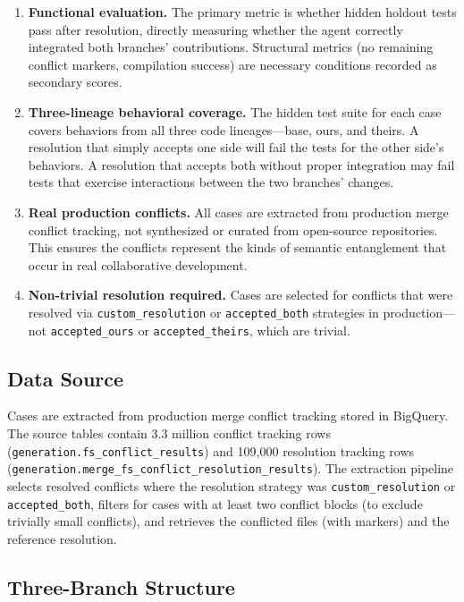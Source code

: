 \documentclass[11pt,a4paper]{article}
\begin{document}
\begin{enumerate}[leftmargin=2em]
\item \textbf{Functional evaluation.} The primary metric is whether hidden holdout tests pass after resolution, directly measuring whether the agent correctly integrated both branches' contributions. Structural metrics (no remaining conflict markers, compilation success) are necessary conditions recorded as secondary scores.

\item \textbf{Three-lineage behavioral coverage.} The hidden test suite for each case covers behaviors from all three code lineages---base, ours, and theirs. A resolution that simply accepts one side will fail the tests for the other side's behaviors. A resolution that accepts both without proper integration may fail tests that exercise interactions between the two branches' changes.

\item \textbf{Real production conflicts.} All cases are extracted from production merge conflict tracking, not synthesized or curated from open-source repositories. This ensures the conflicts represent the kinds of semantic entanglement that occur in real collaborative development.

\item \textbf{Non-trivial resolution required.} Cases are selected for conflicts that were resolved via \texttt{custom\_resolution} or \texttt{accepted\_both} strategies in production---not \texttt{accepted\_ours} or \texttt{accepted\_theirs}, which are trivial.
\end{enumerate}

\subsection{Data Source}

Cases are extracted from production merge conflict tracking stored in BigQuery. The source tables contain 3.3 million conflict tracking rows (\texttt{generation.fs\_conflict\_results}) and 109{,}000 resolution tracking rows (\texttt{generation.merge\_fs\_conflict\_resolution\_results}). The extraction pipeline selects resolved conflicts where the resolution strategy was \texttt{custom\_resolution} or \texttt{accepted\_both}, filters for cases with at least two conflict blocks (to exclude trivially small conflicts), and retrieves the conflicted files (with markers) and the reference resolution.

\subsection{Three-Branch Structure}
\end{document}
